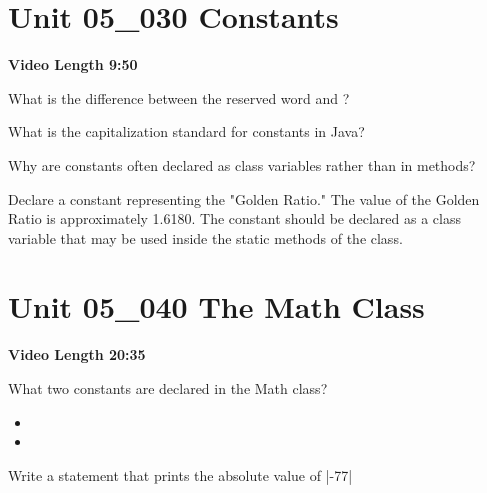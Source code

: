 \documentclass[letterpaper,12pt]{exam}
\newcommand{\unit}{Unit 05}
\begin{document}
\begin{questions}
\section*{\unit\_030 Constants} %
\noindent \textbf{Video Length 9:50}

\begin{samepage}
    \question What is the difference between the reserved word  and ?
    \vspace{5mm}
\end{samepage}

\begin{samepage}
    \question What is the capitalization standard for constants in Java?
    \vspace{5mm}
\end{samepage}

\begin{samepage}
    \question Why are constants often declared as class variables rather than in methods?
    \vspace{5mm}
\end{samepage}

\begin{samepage}
    \question Declare a constant representing the "Golden Ratio."  The value of the Golden Ratio is approximately 1.6180.  The constant should be declared as a class variable that may be used inside the static methods of the class.
    \vspace{5mm}
\end{samepage}

\section*{\unit\_040 The Math Class} %
\noindent \textbf{Video Length 20:35}

\begin{samepage}
    \question What two constants are declared in the Math class?
      \begin{itemize}
        \item 
        \vspace{5mm}
        \item 
        \vspace{5mm}
       \end{itemize}
\end{samepage}

\begin{samepage}
    \question Write a statement that prints the absolute value of |-77|
    \vspace{5mm}
\end{samepage}


\end{questions}
\end{document}
